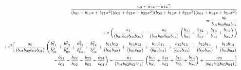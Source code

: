 \documentclass[a4paper,11pt]{article}
\newcommand{\mksmall}[1]{\textnormal{\smaller$#1$}}
\begin{document}
\begin{eqnarray*}
&&
\mksmall{
\frac{a_0 + a_1 x + a_ 2 x^2 }{ (b_{01} + b_{11} x + b_{21} x^2 ) (b_{02} + b_{12} x + b_{22} x^2 ) (b_{03} + b_{13} x + b_{23} x^2) (b_{04} + b_{14} x + b_{24} x^2 )} }
\\&&\quad
\mksmall{
=
  \frac{a_0}{ b_{01} b_{02} b_{03} b_{04}}}
\\&&\quad
\mksmall{
+ x \left( \frac{a_1}{(b_{01} b_{02} b_{03} b_{04})} - \frac{a_0}{(b_{01} b_{02} b_{03} b_{04})} \left( \frac{b_{11}}{b_{01}} + \frac{b_{12}}{b_{02}} + \frac{b_{13}}{b_{03}} + \frac{b_{14}}{b_{04}} \right) \right)}
\\&&\quad
\mksmall{
+ x^2 \Big[
\frac{a_0 }{(b_{01} b_{02} b_{03} b_{04})} \left(
  \frac{b_{11}^2}{b_{01}^2}
+ \frac{b_{12}^2}{b_{02}^2}
+ \frac{b_{13}^2}{b_{03}^2}
+ \frac{b_{14}^2}{b_{04}^2}
+ \frac{b_{11} b_{12} }{(b_{01} b_{02})}
+ \frac{b_{11} b_{13} }{(b_{01} b_{03})}
+ \frac{b_{11} b_{14} }{(b_{01} b_{04})}
+ \frac{b_{12} b_{13} }{(b_{02} b_{03})}
+ \frac{b_{12} b_{14} }{(b_{02} b_{04})}
+ \frac{b_{13} b_{14} }{(b_{03} b_{04})}\right.}
\\&&\quad
\mksmall{\left.
- \frac{b_{21}}{b_{01}}
- \frac{b_{22}}{b_{02} }
- \frac{b_{23}}{b_{03}}
- \frac{b_{24}}{b_{04}}\right)
- \frac{a_1 }{ (b_{01} b_{02} b_{03} b_{04})} \left( \frac{b_{11}}{b_{01}} + \frac{b_{12}}{b_{02}} + \frac{b_{13}}{b_{03}} + \frac{b_{14}}{b_{04}} \right)
+ \frac{a_2 }{ (b_{01} b_{02} b_{03} b_{04})}\Big]
}
\end{eqnarray*}
\end{document}
